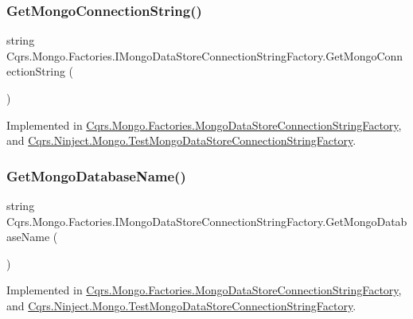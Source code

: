 \subsubsection{\texorpdfstring{Get\+Mongo\+Connection\+String()}{GetMongoConnectionString()}}
{\footnotesize\ttfamily string Cqrs.\+Mongo.\+Factories.\+I\+Mongo\+Data\+Store\+Connection\+String\+Factory.\+Get\+Mongo\+Connection\+String (\begin{DoxyParamCaption}{ }\end{DoxyParamCaption})}



Implemented in \hyperlink{classCqrs_1_1Mongo_1_1Factories_1_1MongoDataStoreConnectionStringFactory_a33064b1b1cbf06ef4f9e12371c7ef785_a33064b1b1cbf06ef4f9e12371c7ef785}{Cqrs.\+Mongo.\+Factories.\+Mongo\+Data\+Store\+Connection\+String\+Factory}, and \hyperlink{classCqrs_1_1Ninject_1_1Mongo_1_1TestMongoDataStoreConnectionStringFactory_ae23b67139698984823fa7c250dcca47a_ae23b67139698984823fa7c250dcca47a}{Cqrs.\+Ninject.\+Mongo.\+Test\+Mongo\+Data\+Store\+Connection\+String\+Factory}.

\mbox{\label{interfaceCqrs_1_1Mongo_1_1Factories_1_1IMongoDataStoreConnectionStringFactory_a90de27c2bf23d7f9412d55c09ab2ec8c_a90de27c2bf23d7f9412d55c09ab2ec8c}} 
\subsubsection{\texorpdfstring{Get\+Mongo\+Database\+Name()}{GetMongoDatabaseName()}}
{\footnotesize\ttfamily string Cqrs.\+Mongo.\+Factories.\+I\+Mongo\+Data\+Store\+Connection\+String\+Factory.\+Get\+Mongo\+Database\+Name (\begin{DoxyParamCaption}{ }\end{DoxyParamCaption})}



Implemented in \hyperlink{classCqrs_1_1Mongo_1_1Factories_1_1MongoDataStoreConnectionStringFactory_a7f330359f2db5b86ad28ac7d8a4c49f1_a7f330359f2db5b86ad28ac7d8a4c49f1}{Cqrs.\+Mongo.\+Factories.\+Mongo\+Data\+Store\+Connection\+String\+Factory}, and \hyperlink{classCqrs_1_1Ninject_1_1Mongo_1_1TestMongoDataStoreConnectionStringFactory_ac638a5771711c1d0746ee0ec55c5e192_ac638a5771711c1d0746ee0ec55c5e192}{Cqrs.\+Ninject.\+Mongo.\+Test\+Mongo\+Data\+Store\+Connection\+String\+Factory}.

